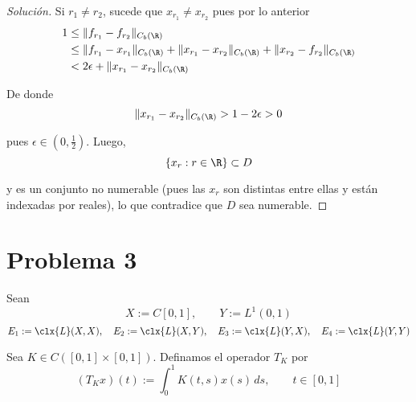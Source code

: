 \documentclass[duedate = 11 de Septiembre, 
			ramo = An\'alisis Funcional, 
			doctype = Tarea 1,
			semester = 2,
			year = 2017]{tarea}
\begin{document}
\begin{enumerate}[(i)]
\begin{proof}[Solución]
	Si $r_{1} \neq r_{2}$, sucede que $x_{r_{1}} \neq x_{r_{2}}$ pues por lo anterior
		\begin{align*}
			1	&\leq		\|f_{r_{1}} - f_{r_{2}}\|_{C_{b}(\R)}	\\
				&\leq		\|f_{r_{1}} - x_{r_{1}}\|_{C_{b}(\R)} + \|x_{r_{1}} - x_{r_{2}}\|_{C_{b}(\R)} + \|x_{r_{2}} - f_{r_{2}}\|_{C_{b}(\R)}	\\
				&<		2\epsilon + \|x_{r_{1}} - x_{r_{2}}\|_{C_{b}(\R)}
		\end{align*}
	
	De donde
		$$\|x_{r_{1}} - x_{r_{2}}\|_{C_{b}(\R)} > 1- 2\epsilon > 0$$
		
	pues $\epsilon \in \left(0,\frac{1}{2}\right)$. Luego,
		$$\{x_{r}: r \in \R\} \subset D$$
	
	y es un conjunto no numerable (pues las $x_{r}$ son distintas entre ellas y están indexadas por reales), lo que contradice que $D$ sea numerable.
	\end{proof}
\end{enumerate}

\newpage
\section*{Problema 3}
Sean
	$$X := C[0,1], \qquad Y := L^{1}(0,1)$$
	$$E_{1} := \clx{L}(X,X), \quad E_{2} := \clx{L}(X,Y), \quad E_{3} := \clx{L}(Y,X), \quad E_{4} := \clx{L}(Y,Y)$$

Sea $K \in C([0,1] \times [0,1])$. Definamos el operador $T_{K}$ por
	$$(T_{K}x)(t) := \int_{0}^{1} K(t,s)x(s) \, ds, \qquad t \in [0,1]$$
\end{document}
